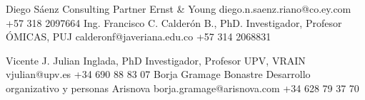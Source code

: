 %
%
%


\begin{referees}
    {Diego Sáenz}
    {Consulting Partner}
    {Ernst \& Young}
    {diego.n.saenz.riano@co.ey.com}
    {+57 318 2097664}
    {Ing. Francisco C. Calderón B., PhD.}
    {Investigador, Profesor}
    {ÓMICAS, PUJ}
    {calderonf@javeriana.edu.co}
    {+57 314 2068831}
\end{referees}
\begin{referees}
    {Vicente J. Julian Inglada, PhD}
    {Investigador, Profesor}
    {UPV, VRAIN}
    {vjulian@upv.es}
    {+34 690 88 83 07}
    {Borja Gramage Bonastre}
    {Desarrollo organizativo y personas}
    {Arisnova}
    {borja.gramage@arisnova.com}
    {+34 628 79 37 70}
\end{referees}
